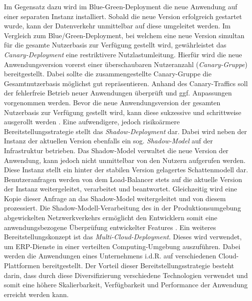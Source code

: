 \vspace*{-15mm}
Im Gegensatz dazu wird im Blue-Green-Deployment die neue Anwendung auf einer separaten Instanz installiert. Sobald die neue Version erfolgreich gestartet wurde, kann der Datenverkehr unmittelbar auf diese umgeleitet werden. Im Vergleich zum Blue/Green-Deployment, bei welchem eine neue Version simultan für die gesamte Nutzerbasis zur Verfügung gestellt wird, gewährleistet das \textit{Canary-Deployment} eine restriktivere Nutzlastumleitung. Hierfür wird die neue Anwendungsversion vorerst einer überschaubaren Nutzeranzahl (\textit{Canary-Gruppe}) bereitgestellt. Dabei sollte die zusammengestellte Canary-Gruppe die Gesamtnutzerbasis möglichst gut repräsentieren. Anhand des Canary-Traffics soll der fehlerfreie Betrieb neuer Anwendungen überprüft und ggf. Anpassungen vorgenommen werden. Bevor die neue Anwendungsversion der gesamten Nutzerbasis zur Verfügung gestellt wird, kann diese sukzessive und schrittweise ausgerollt werden \cite{Ugochi.20220503}. Eine aufwendigere, jedoch risikoärmere Bereitstellungsstrategie stellt das \textit{Shadow-Deployment} dar. Dabei wird neben der Instanz der aktuellen Version ebenfalls ein sog. \textit{Shadow-Model} auf der Infrastruktur betrieben. Das Shadow-Model verwaltet die neue Version der Anwendung, kann jedoch nicht unmittelbar von den Nutzern aufgerufen werden. Diese Instanz stellt ein hinter der stabilen Version gelagertes Schattenmodell dar. Benutzeranfragen werden von dem Load-Balancer stets auf die aktuelle Version der Instanz weitergeleitet, verarbeitet und beantwortet. Gleichzeitig wird eine Kopie dieser Anfrage an das Shadow-Model weitergeleitet und von diesem prozessiert. Die Shadow-Modell-Verarbeitung des in der Produktionsumgebung abgewickelten Netzwerkverkehrs ermöglicht den Entwicklern somit eine anwendungsbezogene Überprüfung entwickelter Features \cite{Ugochi.20220503}. Ein weiteres Bereitstellungskonzept ist das \textit{Multi-Cloud-Deployment}. Dieses wird verwendet, um ERP-Dienste in einer verteilten Computing-Umgebung auszuführen. Dabei werden die Anwendungen eines Unternehmens i.d.R. auf verschiedenen Cloud-Plattformen bereitgestellt. Der Vorteil dieser Bereitstellungsstrategie besteht darin, dass durch diese Diversifizierung verschiedene Technologien verwendet und somit eine höhere Skalierbarkeit, Verfügbarkeit und Performance der Anwendung erreicht werden kann.